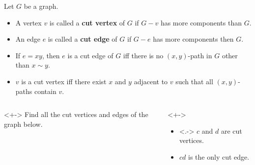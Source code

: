 \documentclass[ignorenonframetext,aspectratio=169]{beamer}
\let\defined\textbf
\begin{document}
\begin{frame}[label=cut-def]
    \begin{definition}
        Let $G$ be a graph.
        \begin{itemize}
            \item A vertex $v$ is called a \defined{cut vertex} of $G$ if $G-v$ has more components than $G$.
            \item An edge $e$ is called a \defined{cut edge} of $G$ if $G-e$ has more components then $G$.
        \end{itemize}
    \end{definition}
    \begin{itemize}
        \item If $e=xy$, then $e$ is a cut edge of $G$ iff
              there is no $(x,y)$-path in $G$ other than $x \sim y$.
        \item $v$ is a cut vertex iff there exist $x$ and $y$ adjacent to $v$
              such that all $(x,y)$-paths contain $v$.
    \end{itemize}
\end{frame}

\begin{frame}[label=cut-ex]
    \begin{columns}
    \begin{column}{0.45\textwidth}
        \begin{example}<+->
            Find all the cut vertices and edges of the graph
            below.
            \begin{center}
            \end{center}
        \end{example}
    \end{column}
    \begin{column}{0.45\textwidth}
        \begin{solution}<+->
            \begin{itemize}
                \item<.-> $c$ and $d$ are cut vertices.
                \item<+-> $cd$ is the only cut edge.
            \end{itemize}
        \end{solution}
    \end{column}
    \end{columns}
\end{frame}
\end{document}
